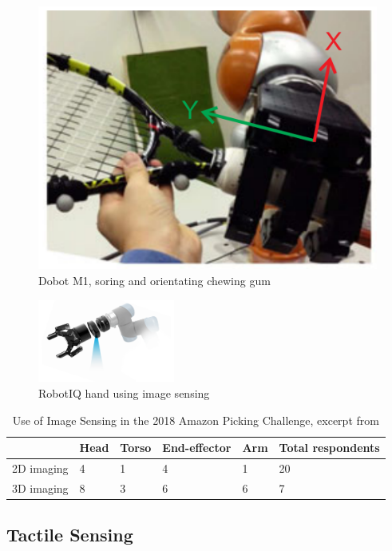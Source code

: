 \begin{figure}
    \centering
    \includegraphics[width=.4\textwidth]{Images/CatchingObjectInFlight.png}
    \caption{Dobot M1, soring and orientating chewing gum}
    \label{fig:IRMarkers}
\end{figure}

\begin{figure}
    \centering
       \includegraphics[width=0.4\textwidth]{Images/robotiq-vision-guided-robotic-hand-system.png}
    \caption[RobotIQ hand using image sensing]{RobotIQ hand using image sensing \cite{RobotIQVisionPic}}
    \label{fig:RobotIQImageSensing}
\end{figure}

\begin{table}[ht]
\centering
\begin{tabular}{|l|l|l|l|l|l|}
            & Head & Torso & End-effector & Arm & Total respondents\\  \hline
2D imaging  & 4    & 1     & 4            & 1   & 20 \\  
3D imaging  & 8    & 3     & 6            & 6  & 7  
\end{tabular}
\caption[Use of Image Sensing in the 2018 Amazon Picking Challenge]{Use of Image Sensing in the 2018 Amazon Picking Challenge, excerpt from \label{table:APCSensorBreakdown}
\cite{APCObservations}}
\end{table}

\subsection{Tactile Sensing}

